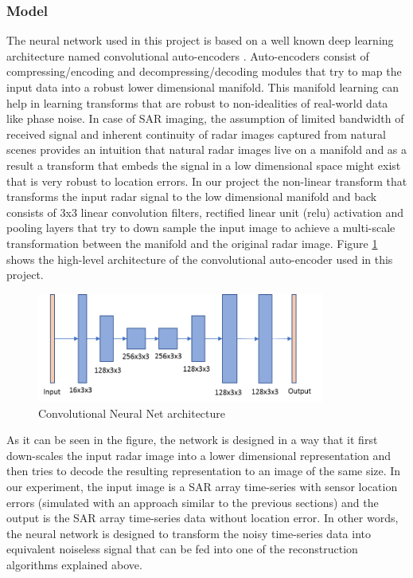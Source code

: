 \documentclass{article}
\begin{document}
\subsubsection{Model}
\indent \indent
The neural network used in this project is based on a well known deep learning architecture named convolutional auto-encoders \cite{masci2011stacked}. Auto-encoders consist of compressing/encoding and decompressing/decoding modules that try to map the input data into a robust lower dimensional manifold. This manifold learning can help in learning transforms that are robust to non-idealities of real-world data like phase noise. In case of SAR imaging, the assumption of limited bandwidth of received signal and inherent continuity of radar images captured from natural scenes provides an intuition that natural radar images live on a manifold and as a result a transform that embeds the signal in a low dimensional space might exist that is very robust to location errors. In our project the non-linear transform that transforms the input radar signal to the low dimensional manifold and back consists of 3x3 linear convolution filters, rectified linear unit (relu) activation and pooling layers that try to down sample the input image to achieve a multi-scale transformation between the manifold and the original radar image. Figure \ref{CNN} shows the high-level architecture of the convolutional auto-encoder used in this project.   
\begin{figure}[h!]
    \centering
    \includegraphics[width=0.845\textwidth]{Figures/CNN.png}
\caption{Convolutional Neural Net architecture}
\label{CNN}
\end{figure}
\newline
\indent
As it can be seen in the figure, the network is designed in a way that it first down-scales the input radar image into a lower dimensional representation and then tries to decode the resulting representation to an image of the same size. In our experiment, the input image is a SAR array time-series with sensor location errors (simulated with an approach similar to the previous sections) and the output is the SAR array time-series data without location error. In other words, the neural network is designed to transform the noisy time-series data into equivalent noiseless signal that can be fed into one of the reconstruction algorithms explained above.
\end{document}
